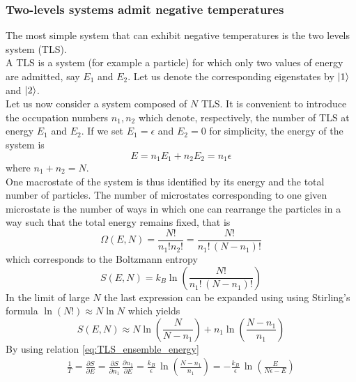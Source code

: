 \subsubsection*{Two-levels systems admit negative temperatures}
The most simple system that can exhibit negative temperatures is the two levels system (TLS). \\
A TLS is a system (for example a particle) for which only two values of energy are admitted, say $E_1$ and $E_2$. Let us denote the 
corresponding eigenstates by $\left| 1 \right\rangle$ and $\left| 2 \right\rangle$. \\
Let us now consider a system composed of $N$ TLS. It is convenient to introduce the occupation numbers $n_1, n_2$ which denote,
respectively, the number of TLS at energy $E_1$ and $E_2$. If we set $E_1=\epsilon$ and $E_2=0$ for simplicity, the energy of the system is
\begin{equation}
    E = n_1 E_1 + n_2 E_2 = n_1\epsilon
    \label{eq:TLS_ensemble_energy}
\end{equation}
where $n_1 + n_2 = N$. \\
One macrostate of the system is thus identified by its energy and the total number of particles. The number of microstates corresponding 
to one given microstate is the number of ways in which one can rearrange the particles in a way such that the total energy remains fixed, that is 
\begin{equation*}
    \Omega(E, N) = \frac{N!}{n_1!n_2!} = \frac{N!}{n_1! \, (N-n_1)!}
\end{equation*}
which corresponds to the Boltzmann entropy 
\begin{equation}
    S(E, N) = k_B\ln\left(\frac{N!}{n_1! \, (N-n_1)!}\right)
    \label{eq:TLS_entropy_N}
\end{equation}
In the limit of large $N$ the last expression can be expanded using using Stirling's formula $\ln(N!) \approx N\ln N$ which yields 
\begin{equation}
    S(E, N) \approx N \ln \left(\frac{N}{N-n_1}\right) + n_1 \ln\left(\frac{N-n_1}{n_1}\right)
    \label{eq:TLS_entropy_N_approx}
\end{equation}
By using relation \ref{eq:TLS_ensemble_energy}
\begin{gather*}
    \frac{1}{T} = \frac{\partial S}{\partial E} = \frac{\partial S}{\partial n_1} \, \frac{\partial n_1}{\partial E} =
    \frac{k_B}{\epsilon} \, \ln\left(\frac{N - n_1}{n_1}\right) = -\frac{k_B}{\epsilon} \, \ln\left(\frac{E}{N\epsilon - E}\right)
\end{gather*}
